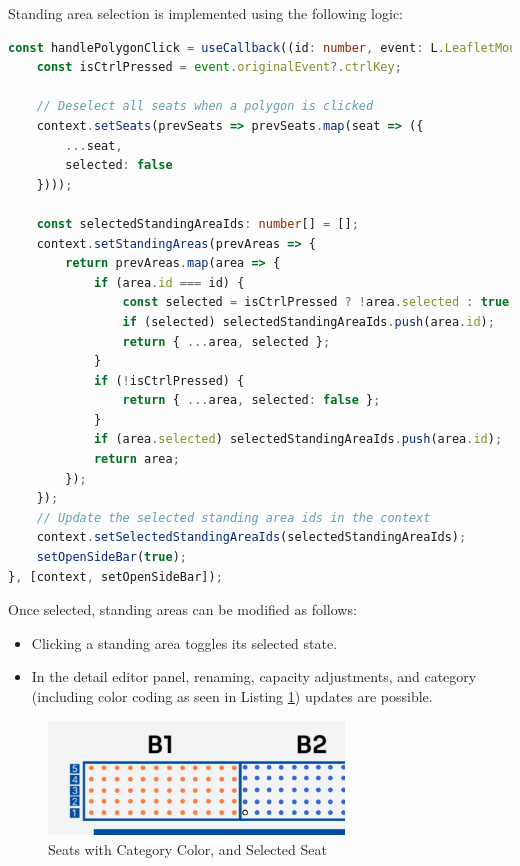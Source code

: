 Standing area selection is implemented using the following logic:
\begin{lstlisting}[language=TypeScript, caption=Handling Standing Area Selection, label=lst:select-standingareas]
const handlePolygonClick = useCallback((id: number, event: L.LeafletMouseEvent) => {
    const isCtrlPressed = event.originalEvent?.ctrlKey;

    // Deselect all seats when a polygon is clicked
    context.setSeats(prevSeats => prevSeats.map(seat => ({
        ...seat,
        selected: false
    })));

    const selectedStandingAreaIds: number[] = [];
    context.setStandingAreas(prevAreas => {
        return prevAreas.map(area => {
            if (area.id === id) {
                const selected = isCtrlPressed ? !area.selected : true;
                if (selected) selectedStandingAreaIds.push(area.id);
                return { ...area, selected };
            }
            if (!isCtrlPressed) {
                return { ...area, selected: false };
            }
            if (area.selected) selectedStandingAreaIds.push(area.id);
            return area;
        });
    });
    // Update the selected standing area ids in the context
    context.setSelectedStandingAreaIds(selectedStandingAreaIds);
    setOpenSideBar(true);
}, [context, setOpenSideBar]);
\end{lstlisting}

Once selected, standing areas can be modified as follows:
\begin{itemize}
    \item Clicking a standing area toggles its selected state.
    \item In the detail editor panel, renaming, capacity adjustments, and category (including color coding as seen in Listing \ref{fig:map-component-category}) updates are possible.
\end{itemize}

\begin{figure}[H]
    \centering
    \includegraphics[width=0.7\textwidth]{pics/MapComponentCategoryAndSelectedSeat.png}
    \caption{Seats with Category Color, and Selected Seat}
    \label{fig:map-component-category}
\end{figure}

